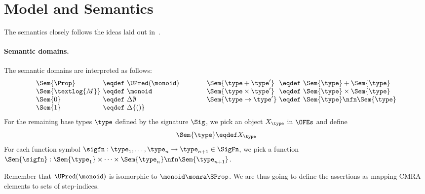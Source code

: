 \section{Model and Semantics}
\label{sec:model}

The semantics closely follows the ideas laid out in~\cite{catlogic}.

\paragraph{Semantic domains.}

The semantic  domains are interpreted as follows:
\[
\begin{array}[t]{@{}l@{\ }c@{\ }l@{}}
\Sem{\Prop} &\eqdef& \UPred(\monoid)  \\
\Sem{\textlog{M}} &\eqdef& \monoid \\
\Sem{0} &\eqdef& \Delta \emptyset \\
\Sem{1} &\eqdef& \Delta \{ () \}
\end{array}
\qquad\qquad
\begin{array}[t]{@{}l@{\ }c@{\ }l@{}}
\Sem{\type + \type'} &\eqdef& \Sem{\type} + \Sem{\type} \\
\Sem{\type \times \type'} &\eqdef& \Sem{\type} \times \Sem{\type} \\
\Sem{\type \to \type'} &\eqdef& \Sem{\type} \nfn \Sem{\type} \\
\end{array}
\]
For the remaining base types $\type$ defined by the signature $\Sig$, we pick an object $X_\type$ in $\OFEs$ and define
\[
\Sem{\type} \eqdef X_\type
\]
For each function symbol $\sigfn : \type_1, \dots, \type_n \to \type_{n+1} \in \SigFn$, we pick a function $\Sem{\sigfn} : \Sem{\type_1} \times \dots \times \Sem{\type_n} \nfn \Sem{\type_{n+1}}$.


Remember that $\UPred(\monoid)$ is isomorphic to $\monoid \monra \SProp$.
We are thus going to define the assertions as mapping CMRA elements to sets of step-indices.

